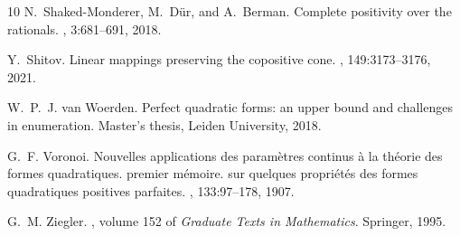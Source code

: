 \documentclass{commat}
\begin{document}
{\begin{thebibliography}{10}
N.~Shaked-Monderer, M.~Dür, and A.~Berman.
\newblock Complete positivity over the rationals.
, 3:681--691, 2018.

Y.~Shitov.
\newblock Linear mappings preserving the copositive cone.
,
  149:3173--3176, 2021.

W.~P.~J. van Woerden.
\newblock Perfect quadratic forms: an upper bound and challenges in
  enumeration.
\newblock Master's thesis, Leiden University, 2018.

G.~F. Voronoi.
\newblock Nouvelles applications des paramètres continus à la théorie des
  formes quadratiques. premier mémoire. sur quelques propriétés des formes
  quadratiques positives parfaites.
, 133:97--178,
  1907.

G.~M. Ziegler.
, volume 152 of {\em Graduate Texts in
  Mathematics}.
\newblock Springer, 1995.

\end{thebibliography}
}


\end{document}

